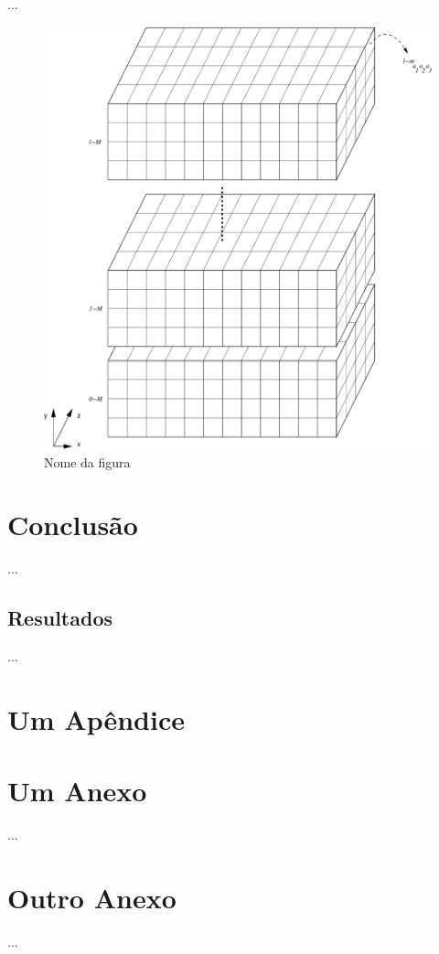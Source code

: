 \documentclass[diss,capa]{texufpel}
\begin{document}
  ...

\begin{figure}[htbp]
  \centering \includegraphics[scale=.4]{images/figura}
\caption{Nome da figura} 
\label{figura}
\end{figure}


\chapter{Conclusão}

...

\section{Resultados}

...



 

\apendices
\chapter{Um Apêndice}

\anexos
\chapter{Um Anexo}

...

\chapter{Outro Anexo}

...

\end{document}

